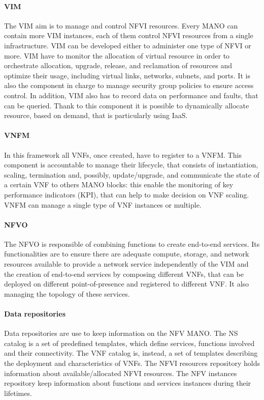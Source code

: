 \paragraph*{VIM}
The VIM aim is to manage and control NFVI resources. Every MANO can contain more
VIM instances, each of them control NFVI resources from a single infrastructure.
VIM can be developed either to administer one type of NFVI or more. VIM have to
monitor the allocation of virtual resource in order to orchestrate allocation,
upgrade, release, and reclamation of resources and optimize their usage,
including virtual links, networks, subnets, and ports. It is also the component
in charge to manage security group policies to ensure access control. In
addition, VIM also has to record data on performance and faults, that can be
queried. Thank to this component it is possible to dynamically allocate
resource, based on demand, that is particularly using IaaS.

\paragraph*{VNFM} 
In this framework all VNFs, once created, have to register to a VNFM. This
component is accountable to manage their lifecycle, that consists of
instantiation, scaling, termination and, possibly, update/upgrade, and
communicate the state of a certain VNF to others MANO blocks: this enable the
monitoring of key performance indicators (KPI), that can help to make decision
on VNF scaling. VNFM can manage a single type of VNF instances or multiple.

\paragraph*{NFVO}
The NFVO is responsible of combining functions to create end-to-end services.
Its functionalities are to ensure there are adequate compute, storage, and
network resources available to provide a network service independently of the
VIM and the creation of end-to-end services by composing different VNFs, that
can be deployed on different point-of-presence and registered to different VNF.
It also managing the topology of these services. 

\paragraph*{Data repositories} Data repositories are use to keep information on
the NFV MANO. The NS catalog is a set of predefined templates, which define
services, functions involved and their connectivity. The VNF catalog is,
instead, a set of templates describing the deployment and characteristics of
VNFs. The NFVI resources repository holds information about available/allocated
NFVI resources. The NFV instances repository keep information about functions
and services instances during their lifetimes.

